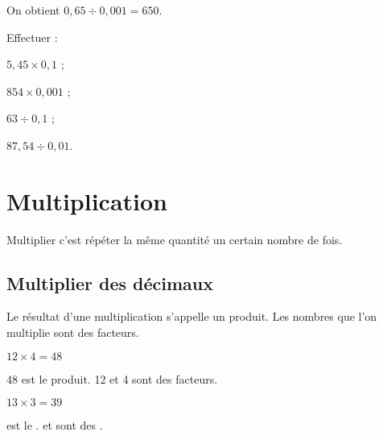 \begin{methode*1}
\begin{exemple*1}
\begin{minipage}{.55\linewidth}
On obtient $0,65 \div 0,001 = 650$.
\end{minipage}
\end{exemple*1}


\exercice

Effectuer :
\begin{colenumerate}{4}
 \item $5,45 \times 0,1$ ;
 \item $854 \times 0,001$ ;
 \item $63 \div 0,1$ ;
 \item $87,54 \div 0,01$.
 \end{colenumerate}

\end{methode*1}

\section{Multiplication}
\begin{remarque}

Multiplier c'est répéter la même quantité un certain nombre de fois.
\end{remarque}
	\subsection{Multiplier des décimaux}
\begin{aconnaitre}
Le résultat d'une multiplication s'appelle un produit. Les nombres que l'on multiplie sont des facteurs.
\end{aconnaitre}

\begin{methode*1}[Multiplication]
\begin{exemple*1}

$12 \times 4=48$

48 est le produit. 12 et 4 sont des facteurs.
\end{exemple*1}

\exercice

$13\times 3=39$

\dotfill est le \dotfill . \dotfill et \dotfill sont des \dotfill .

\end{methode*1}

